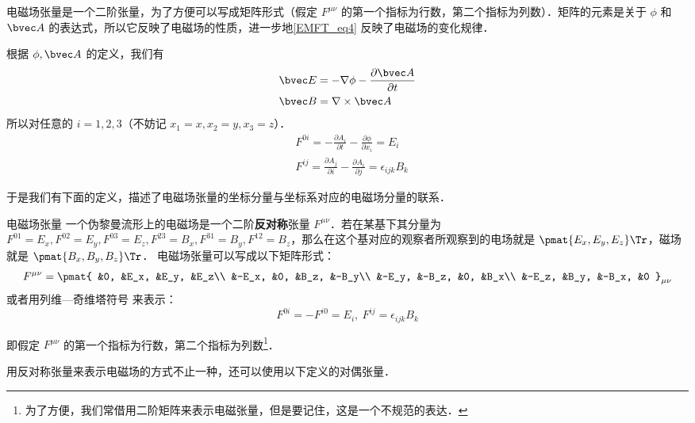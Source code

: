 电磁场张量是一个二阶张量，为了方便可以写成矩阵形式（假定 $F^{\mu\nu}$ 的第一个指标为行数，第二个指标为列数）．矩阵的元素是关于 $\phi$ 和 $\bvec A$ 的表达式，所以它反映了电磁场的性质，进一步地\autoref{EMFT_eq4} 反映了电磁场的变化规律．

根据 $\phi,\bvec A$ 的定义，我们有
\begin{equation}
\begin{aligned}
&\bvec E=-\nabla \phi-\frac{ \partial \bvec A}{\partial t}
\\
&\bvec B=\nabla\times \bvec A
\end{aligned}
\end{equation}
所以对任意的 $i=1,2,3$（不妨记 $x_1=x,x_2=y,x_3=z$）．
\begin{equation}
\begin{aligned}
&F^{0i}=-\frac{\partial A_i}{\partial t}-\frac{\partial \phi}{\partial x_i}=E_i\\
&F^{ij}=\frac{\partial A_j}{\partial i}-\frac{\partial A_i}{\partial j}=\epsilon_{ijk}B_k
\end{aligned}
\end{equation}

于是我们有下面的定义，描述了电磁场张量的坐标分量与坐标系对应的电磁场分量的联系．

\begin{definition}{电磁场张量}
一个伪黎曼流形上的电磁场是一个二阶\textbf{反对称}张量 $F^{\mu\nu}$．若在某基下其分量为 $F^{01}=E_x, F^{02}=E_y, F^{03}=E_z, F^{23}=B_x, F^{31}=B_y, F^{12}=B_z$，那么在这个基对应的观察者所观察到的电场就是 $\pmat{E_x, E_y, E_z}\Tr$，磁场就是 $\pmat{B_x, B_y, B_z}\Tr$．
电磁场张量可以写成以下矩阵形式：
\begin{equation}\label{EMFT_eq1}
F^{\mu\nu}=\pmat{
&0, &E_x, &E_y, &E_z\\
&-E_x, &0, &B_z, &-B_y\\
&-E_y, &-B_z, &0, &B_x\\
&-E_z, &B_y, &-B_x, &0
}_{\mu\nu}
\end{equation}
或者用列维—奇维塔符号 来表示：
\begin{equation}
F^{0 i}=-F^{i 0}=E_i,\ F^{ij}=\epsilon_{ijk}B_k
\end{equation}
\end{definition}
即假定 $F^{\mu\nu}$ 的第一个指标为行数，第二个指标为列数\footnote{为了方便，我们常借用二阶矩阵来表示电磁张量，但是要记住，这是一个不规范的表达．}．

用反对称张量来表示电磁场的方式不止一种，还可以使用以下定义的对偶张量．

